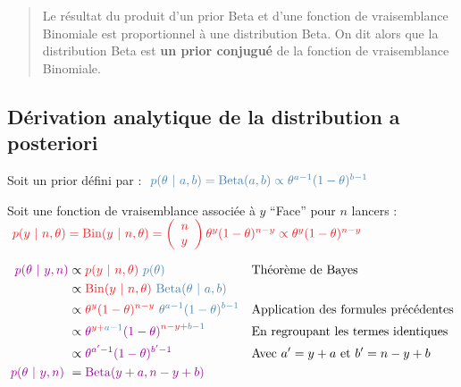 \documentclass[
  a4paper,11pt,twoside,onecolumn,openright,final,oldfontcommands]{memoir}
\theoremstyle{definition}
\theoremstyle{definition}
\theoremstyle{definition}
\theoremstyle{definition}
\theoremstyle{remark}
\begin{document}
\begin{quote}
Le résultat du produit d'un prior Beta et d'une fonction de vraisemblance Binomiale est proportionnel à une distribution Beta. On dit alors que la distribution Beta est \textbf{un prior conjugué} de la fonction de vraisemblance Binomiale.
\end{quote}

\hypertarget{duxe9rivation-analytique-de-la-distribution-a-posteriori}{%
\subsection{Dérivation analytique de la distribution a posteriori}\label{duxe9rivation-analytique-de-la-distribution-a-posteriori}}

Soit un prior défini par : \(\ \color{steelblue}{p(\theta \ | \ a, b) = \mathrm{Beta}(a, b) \propto \theta^{a - 1}(1 - \theta)^{b - 1}}\)

Soit une fonction de vraisemblance associée à \(y\) ``Face'' pour \(n\) lancers : \(\ \color{orangered}{p(y \ | \ n, \theta) = \mathrm{Bin}(y \ | \ n, \theta) = \left(\begin{array}{l} n \\ y \end{array}\right) \theta^{y}(1 - \theta)^{n - y} \propto \theta^{y}(1 - \theta)^{n - y}}\)

\[
\begin{aligned}
\color{purple}{p(\theta \ | \ y, n)} &\propto \color{orangered}{p(y \ | \ n, \theta)} \ \color{steelblue}{p(\theta)} &&\mbox{Théorème de Bayes} \\
&\propto \color{orangered}{\mathrm{Bin}(y \ | \ n, \theta)} \ \color{steelblue}{\mathrm{Beta}(\theta \ | \ a, b)} \\
&\propto \color{orangered}{\theta^{y}(1 - \theta)^{n - y}} \ \color{steelblue}{\theta^{a - 1}(1 - \theta)^{b - 1}} &&\mbox{Application des formules précédentes} \\
&\propto \color{purple}{\theta}^{\color{orangered}{y} + \color{steelblue}{a - 1}}\color{purple}{(1 - \theta)}^{\color{orangered}{n - y} + \color{steelblue}{b - 1}} &&\mbox{En regroupant les termes identiques} \\
&\propto \color{purple}{\theta^{a' - 1}(1 - \theta)^{b' - 1}} &&\mbox{Avec } a' = y + a \mbox{ et } b' = n - y + b \\
\color{purple}{p(\theta \ | \ y, n)} \ &= \color{purple}{\mathrm{Beta}(y + a, n - y + b)}
\end{aligned}
\]
\end{document}
